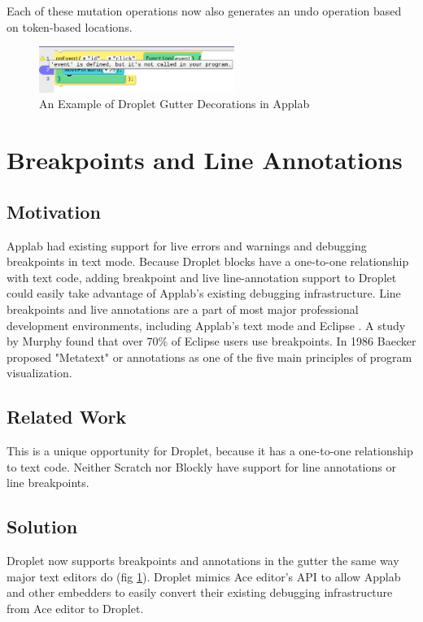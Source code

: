 \documentclass[conference]{IEEEtran}
\begin{document}
Each of these mutation operations now also generates an undo operation based on token-based locations.

\begin{figure}
\centering
\includegraphics[width=2.5in]{breakpoint_annotations.png}
\caption{An Example of Droplet Gutter Decorations in Applab}
\label{breakpoints}
\end{figure}

\section{Breakpoints and Line Annotations}

\subsection{Motivation}
Applab had existing support for live errors and warnings and debugging breakpoints in text mode. Because Droplet blocks have a one-to-one relationship with text code, adding breakpoint and live line-annotation support to Droplet could easily take advantage of Applab's existing debugging infrastructure. Line breakpoints and live annotations are a part of most major professional development environments, including Applab's text mode and Eclipse \cite{Eclipse}. A study by Murphy \cite{Murphy} found that over 70\% of Eclipse users use breakpoints. In 1986 Baecker \cite{Baecker} proposed "Metatext" or annotations as one of the five main principles of program visualization.

\subsection{Related Work}
This is a unique opportunity for Droplet, because it has a one-to-one relationship to text code. Neither Scratch nor Blockly have support for line annotations or line breakpoints.

\subsection{Solution}
Droplet now supports breakpoints and annotations in the gutter the same way major text editors do (fig \ref{breakpoints}). Droplet mimics Ace editor's API to allow Applab and other embedders to easily convert their existing debugging infrastructure from Ace editor to Droplet.
\end{document}
